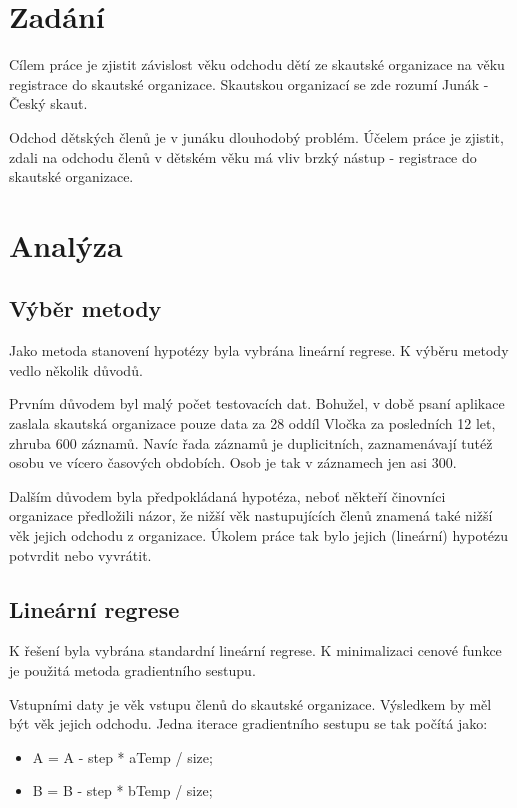 \documentclass[a4paper,12pt]{article}
\begin{document}
\section{Zadání}
Cílem práce je zjistit závislost věku odchodu dětí ze skautské organizace na věku registrace do skautské organizace. Skautskou organizací se zde rozumí Junák - Český skaut.

Odchod dětských členů je v junáku dlouhodobý problém. Účelem práce je zjistit, zdali na odchodu členů v dětském věku má vliv brzký nástup - registrace do skautské organizace. 

\section{Analýza}

\subsection{Výběr metody}
Jako metoda stanovení hypotézy byla vybrána lineární regrese. K výběru metody vedlo několik důvodů.

Prvním důvodem byl malý počet testovacích dat. Bohužel, v době psaní aplikace zaslala skautská organizace pouze data za 28 oddíl Vločka za posledních 12 let, zhruba 600 záznamů. Navíc řada záznamů je duplicitních, zaznamenávají tutéž osobu ve vícero časových obdobích. Osob je tak v záznamech jen asi 300.

Dalším důvodem byla předpokládaná hypotéza, neboť někteří činovníci organizace předložili názor, že nižší věk nastupujících členů znamená také nižší věk jejich odchodu z organizace. Úkolem práce tak bylo jejich (lineární) hypotézu potvrdit nebo vyvrátit.

\subsection{Lineární regrese}
K řešení byla vybrána standardní lineární regrese. K minimalizaci cenové funkce je použitá metoda gradientního sestupu.

Vstupními daty je věk vstupu členů do skautské organizace. Výsledkem by měl být věk jejich odchodu. Jedna iterace gradientního sestupu se tak počítá jako:

\begin{itemize}
\item A = A - step * aTemp / size;
\item B = B - step * bTemp / size;
\end{itemize}
\end{document}
